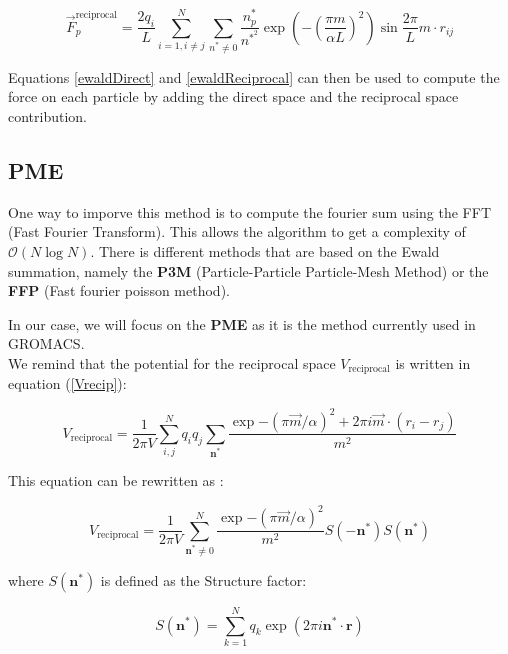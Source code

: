 \documentclass[12pt,twoside,a4paper]{report}
\begin{document}
\begin{equation}
\label{ewaldReciprocal}
   \overrightarrow{F}_p^{\text{reciprocal}} = \frac{2 q_i}{L} \sum\limits_{i=1,i\neq j}^N \sum_{n^* \neq 0} \frac{n_p^*}{n^{*^2}} \exp{(-(\frac{\pi m}{\alpha L})^2)}\sin{\frac{2\pi}{L} m \cdot r_{ij} }
\end{equation}

Equations \ref{ewaldDirect} and \ref{ewaldReciprocal} can then be used to compute the force on each particle by adding the direct space and the reciprocal space contribution.\\


\subsection{PME}

One way to imporve this method is to compute the fourier sum using the FFT (Fast Fourier Transform). This allows the algorithm to get a complexity of $\mathcal{O}(N\log N)$. There is different methods that are based on the Ewald summation, namely the \textbf{P3M} (Particle-Particle Particle-Mesh Method) or the \textbf{FFP} (Fast fourier poisson method). 

In our case, we will focus on the \textbf{PME} as it is the method currently used in GROMACS. \\

We remind that the potential for the reciprocal space $V_{\text{reciprocal}}$ is written in equation (\ref{Vrecip}):


\begin{equation*}
    V_{\text{reciprocal}} =\frac{1}{2 \pi V} \sum\limits_{i,j}^{N} q_i q_j \sum\limits_{\textbf{n}^*} \frac{\exp{-(\pi \overrightarrow{m}/\alpha)^2} +2\pi i \overrightarrow{m} \cdot (r_i - r_j)}{m^2}    
\end{equation*}



This equation can be rewritten as :

\begin{equation*}
    V_{\text{reciprocal}} =\frac{1}{2 \pi V} \sum\limits_{\textbf{n}^* \neq 0}^{N}  \frac{\exp{-(\pi \overrightarrow{m}/\alpha)^2}}{m^2}S(-\textbf{n}^* )S(\textbf{n}^* )
\end{equation*}

where $S(\textbf{n}^* )$ is defined as the Structure factor:

\begin{equation}
    S(\textbf{n}^* ) = \sum\limits_{k=1}^{N} {q_k \exp(2 \pi i \textbf{n}^* \cdot \textbf{r}) }
\end{equation}
\end{document}
